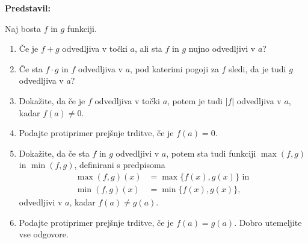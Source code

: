 \textbf{Predstavil:}

Naj bosta $f$ in $g$ funkciji. 
		\begin{enumerate}
			\item Če je $f+g$ odvedljiva v točki $a$, ali sta $f$ in $g$ nujno odvedljivi v $a$? 
			\item Če sta $f \cdot g$ in $f$ odvedljiva v $a$, pod katerimi pogoji za $f$ sledi, da je tudi $g$ odvedljiva v $a$?
			\item Dokažite, da če je $f$ odvedljiva v točki $a$, potem je tudi $|f|$ odvedljiva v $a$, kadar $f(a) \neq 0$. 
			\item Podajte protiprimer prejšnje trditve, če je $f(a) = 0$. 
			\item Dokažite, da če sta $f$ in $g$ odvedljivi v $a$, potem sta tudi funkciji $\max(f,g)$ in $\min(f,g)$, definirani s predpisoma 
			\begin{align*}
				\max(f,g)(x) &= \max\{f(x),g(x)\} \text{ in }\\
				\min(f,g)(x) &= \min\{f(x),g(x)\},
			\end{align*}
			odvedljivi v $a$, kadar $f(a) \neq g(a)$.
			\item Podajte protiprimer prejšnje trditve, če je $f(a) = g(a)$.
			Dobro utemeljite vse odgovore.
		\end{enumerate}